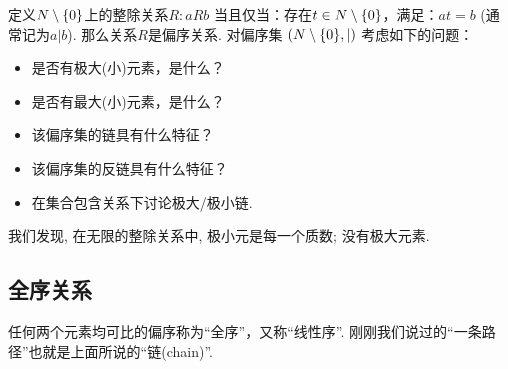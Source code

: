 \begin{example}
	定义$N\setminus\{0\}$上的整除关系$R: aRb$ 当且仅当：存在$t\in N\setminus\{0\}$，满足：$at=b$ (通常记为$a|b$). 那么关系$R$是偏序关系. 对偏序集 $(N\setminus\{0\}, | )$ 考虑如下的问题：
	
	\begin{itemize}
		\item 是否有极大(小)元素，是什么？
		\item 是否有最大(小)元素，是什么？
		\item 该偏序集的链具有什么特征？
		\item 该偏序集的反链具有什么特征？
		\item 在集合包含关系下讨论极大/极小链.
	\end{itemize}
	
	
\end{example}

我们发现, 在无限的整除关系中, 极小元是每一个质数; 没有极大元素. 


\subsection{全序关系}

任何两个元素均可比的偏序称为“全序”，又称“线性序”. 刚刚我们说过的``一条路径''也就是上面所说的``链(chain)''. 

















